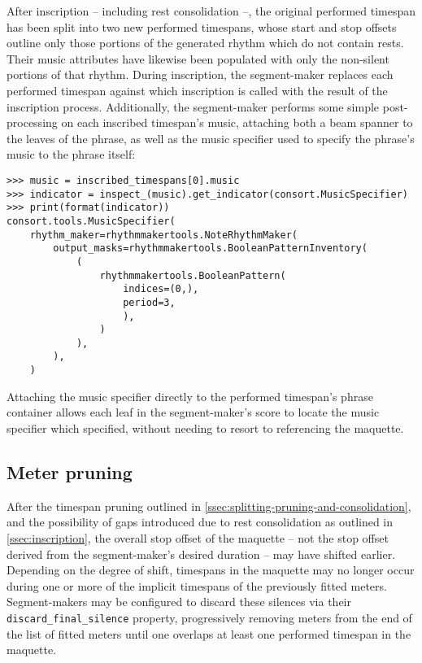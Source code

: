 \noindent After inscription -- including rest consolidation --, the original
performed timespan has been split into two new performed timespans, whose start
and stop offsets outline only those portions of the generated rhythm which do
not contain rests. Their music attributes have likewise been populated with
only the non-silent portions of that rhythm. During inscription, the
segment-maker replaces each performed timespan against which inscription is
called with the result of the inscription process. Additionally, the
segment-maker performs some simple post-processing on each inscribed timespan's
music, attaching both a beam spanner to the leaves of the phrase, as well as
the music specifier used to specify the phrase's music to the phrase itself:

\begin{comment}
<abjad>
music = inscribed_timespans[0].music
indicator = inspect_(music).get_indicator(consort.MusicSpecifier)
print(format(indicator))
</abjad>
\end{comment}

\begin{abjadbookoutput}
\begin{singlespacing}
\vspace{-0.5\baselineskip}
\begin{verbatim}
>>> music = inscribed_timespans[0].music
>>> indicator = inspect_(music).get_indicator(consort.MusicSpecifier)
>>> print(format(indicator))
consort.tools.MusicSpecifier(
    rhythm_maker=rhythmmakertools.NoteRhythmMaker(
        output_masks=rhythmmakertools.BooleanPatternInventory(
            (
                rhythmmakertools.BooleanPattern(
                    indices=(0,),
                    period=3,
                    ),
                )
            ),
        ),
    )
\end{verbatim}
\end{singlespacing}
\end{abjadbookoutput}

\noindent Attaching the music specifier directly to the performed timespan's
phrase container allows each leaf in the segment-maker's score to locate the
music specifier which specified, without needing to resort to referencing the
maquette.

\subsection{Meter pruning}
\label{ssec:meter-pruning}

After the timespan pruning outlined in
\autoref{ssec:splitting-pruning-and-consolidation}, and the possibility of gaps
introduced due to rest consolidation as outlined in \autoref{ssec:inscription},
the overall stop offset of the maquette -- not the stop offset derived from the
segment-maker's desired duration -- may have shifted earlier. Depending on the
degree of shift, timespans in the maquette may no longer occur during one or
more of the implicit timespans of the previously fitted meters. Segment-makers
may be configured to discard these silences via their
\texttt{discard\_final\_silence} property, progressively removing meters from
the end of the list of fitted meters until one overlaps at least one performed
timespan in the maquette.

